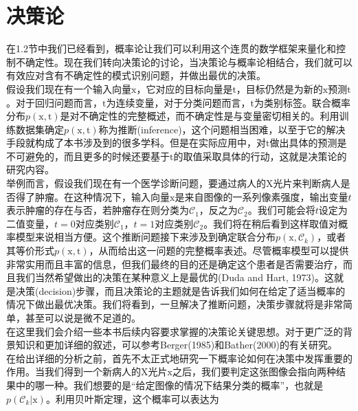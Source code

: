 \documentclass[b5paper]{book}
\numberwithin{equation}{chapter}
\begin{document}
	\section{决策论}
	\noindent{\color{red} \rule[10pt]{\textwidth}{0.1em}}
	\textnormal{
	\indent 在1.2节中我们已经看到，概率论让我们可以利用这个连贯的数学框架来量化和控制不确定性。现在我们转向决策论的讨论，当决策论与概率论相结合，我们就可以有效应对含有不确定性的模式识别问题，并做出最优的决策。\\
	\indent 假设我们现在有一个输入向量$\boldsymbol{\mathrm{x}}$，它对应的目标向量是$\boldsymbol{\mathrm{t}}$，目标仍然是为新的$\boldsymbol{\mathrm{x}}$预测$\boldsymbol{\mathrm{t}}$。对于回归问题而言，$\boldsymbol{\mathrm{t}}$为连续变量，对于分类问题而言，$\boldsymbol{\mathrm{t}}$为类别标签。联合概率分布$p(\boldsymbol{\mathrm{x}},\boldsymbol{\mathrm{t}})$是对不确定性的完整概述，而不确定性是与变量密切相关的。利用训练数据集确定$p(\boldsymbol{\mathrm{x}},\boldsymbol{\mathrm{t}})$称为推断(inference)，这个问题相当困难，以至于它的解决手段就构成了本书涉及到的很多学科。但是在实际应用中，对$\boldsymbol{\mathrm{t}}$做出具体的预测是不可避免的，而且更多的时候还要基于$\boldsymbol{\mathrm{t}}$的取值采取具体的行动，这就是决策论的研究内容。\\
	\indent 举例而言，假设我们现在有一个医学诊断问题，要通过病人的X光片来判断病人是否得了肿瘤。在这种情况下，输入向量$\boldsymbol{\mathrm{x}}$是来自图像的一系列像素强度，输出变量$t$表示肿瘤的存在与否，若肿瘤存在则分类为$\mathcal{C}_1$，反之为$\mathcal{C}_2$。我们可能会将$t$设定为二值变量，$t=0$对应类别$\mathcal{C}_1$，$t=1$对应类别$\mathcal{C}_2$。我们将在稍后看到这样取值对概率模型来说相当方便。这个推断问题接下来涉及到确定联合分布$p(\boldsymbol{\mathrm{x}},\mathcal{C}_k)$，或者其等价形式$p(\boldsymbol{\mathrm{x}},\boldsymbol{\mathrm{t}})$，从而给出这一问题的完整概率表述。尽管概率模型可以提供非常实用而且丰富的信息，但我们最终的目的还是确定这个患者是否需要治疗，而且我们当然希望做出的决策在某种意义上是最优的(Duda and Hart, 1973)。这就是决策(decision)步骤，而且决策论的主题就是告诉我们如何在给定了适当概率的情况下做出最优决策。我们将看到，一旦解决了推断问题，决策步骤就将是非常简单，甚至可以说是微不足道的。\\
	\indent 在这里我们会介绍一些本书后续内容要求掌握的决策论关键思想。对于更广泛的背景知识和更加详细的叙述，可以参考Berger(1985)和Bather(2000)的有关研究。\\
	\indent 在给出详细的分析之前，首先不太正式地研究一下概率论如何在决策中发挥重要的作用。当我们得到一个新病人的X光片$\boldsymbol{\mathrm{x}}$之后，我们要判定这张图像会指向两种结果中的哪一种。我们想要的是“给定图像的情况下结果分类的概率”，也就是$p(\mathcal{C}_k | \boldsymbol{\mathrm{x}})$。利用贝叶斯定理，这个概率可以表达为
}
\end{document}

